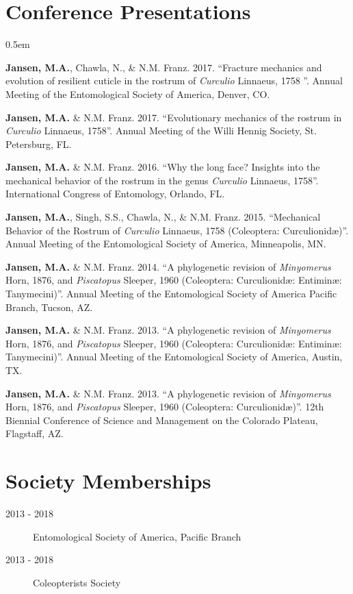 \documentclass[12pt,a4paper]{article}
\begin{document}
\section*{Conference Presentations}
	\begin{description}
		\itemsep0.5em
		\item \textbf{Jansen, M.A.}, Chawla, N., \& N.M. Franz. 2017. ``Fracture mechanics and evolution of resilient cuticle in the rostrum of \textit{Curculio} Linnaeus, 1758 ''. Annual Meeting of the Entomological Society of America, Denver, CO.
		\item \textbf{Jansen, M.A.} \& N.M. Franz. 2017. ``Evolutionary mechanics of the rostrum in \textit{Curculio} Linnaeus, 1758''. Annual Meeting of the Willi Hennig Society, St. Petersburg, FL.
		\item \textbf{Jansen, M.A.} \& N.M. Franz. 2016. ``Why the long face? Insights into the mechanical behavior of the rostrum in the genus \textit{Curculio} Linnaeus, 1758''. International Congress of Entomology, Orlando, FL.
		\item \textbf{Jansen, M.A.}, Singh, S.S., Chawla, N., \& N.M. Franz. 2015. ``Mechanical Behavior of the Rostrum of \textit{Curculio} Linnaeus, 1758 (Coleoptera: Curculionid\ae)''. Annual Meeting of the Entomological Society of America, Minneapolis, MN.
		\item \textbf{Jansen, M.A.} \& N.M. Franz. 2014. ``A phylogenetic revision of \textit{Minyomerus} Horn, 1876, and \textit{Piscatopus} Sleeper, 1960 (Coleoptera: Curculionid\ae: Entimin\ae: Tanymecini)''. Annual Meeting of the Entomological Society of America Pacific Branch, Tucson, AZ.
		\item \textbf{Jansen, M.A.} \& N.M. Franz. 2013. ``A phylogenetic revision of \textit{Minyomerus} Horn, 1876, and \textit{Piscatopus} Sleeper, 1960 (Coleoptera: Curculionid\ae: Entimin\ae: Tanymecini)''. Annual Meeting of the Entomological Society of America, Austin, TX.
		\item \textbf{Jansen, M.A.} \& N.M. Franz. 2013. ``A phylogenetic revision of \textit{Minyomerus} Horn, 1876, and \textit{Piscatopus} Sleeper, 1960 (Coleoptera: Curculionid\ae)''. 12th Biennial Conference of Science and Management on the Colorado Plateau, Flagstaff, AZ.
	\end{description}

\section*{Society Memberships}
	\begin{description}
		\item [2013 - 2018] Entomological Society of America, Pacific Branch
		\item [2013 - 2018] Coleopterists Society
	\end{description}
\end{document}
